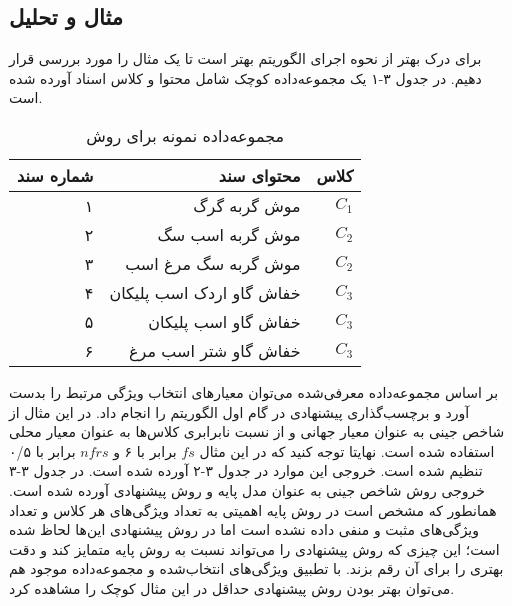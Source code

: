 \subsection{مثال و تحلیل}
برای درک بهتر از نحوه اجرای الگوریتم بهتر است تا یک مثال را مورد بررسی قرار دهیم.\cite{uysal2016improved}  در جدول ۳-۱ یک مجموعه‌داده کوچک شامل محتوا و کلاس اسناد آورده شده است. 

\begin{table}
\begin{center}
\caption{مجموعه‌داده نمونه برای روش }
\begin{tabular}{r|r|r}
\toprule
\textbf{شماره سند} & \textbf{محتوای سند} & \textbf{کلاس}
\\
\hline
\hline
۱ & موش گربه گرگ & $C_1$
\\
۲ & موش گربه اسب سگ & $C_2$
\\
۳ & موش گربه سگ مرغ اسب & $C_2$
\\
۴ & خفاش گاو اردک اسب پلیکان & $C_3$
\\
۵ & خفاش گاو اسب پلیکان & $C_3$
\\
۶ & خفاش گاو شتر اسب مرغ & $C_3$
\\
\bottomrule
\end{tabular}
\end{center}
\end{table}

بر اساس مجموعه‌داده معرفی‌شده می‌توان معیار‌های انتخاب ویژگی مرتبط را بدست آورد و برچسب‌گذاری پیشنهادی در گام اول الگوریتم را انجام داد. در این مثال از شاخص جینی به عنوان معیار جهانی و از نسبت نابرابری کلاس‌ها به عنوان معیار محلی استفاده شده است. نهایتا توجه کنید که در این مثال $fs$ برابر با ۶ و $nfrs$‌ برابر با ۰/۵ تنظیم شده است. خروجی این موارد در جدول ۳-۲ آورده شده است. در جدول ۳-۳ خروجی روش شاخص جینی به عنوان مدل پایه و روش پیشنهادی آورده شده است. همانطور که مشخص است در روش پایه اهمیتی به تعداد ویژگی‌های هر کلاس و تعداد ویژگی‌های مثبت و منفی داده نشده است اما در روش پیشنهادی این‌ها لحاظ شده است؛ این چیزی که روش پیشنهادی را می‌تواند نسبت  به روش پایه متمایز کند و دقت بهتری را برای آن رقم بزند. با تطبیق ویژگی‌های انتخاب‌شده و مجموعه‌داده موجود هم می‌توان بهتر بودن روش پیشنهادی حداقل در این مثال کوچک را مشاهده کرد.

